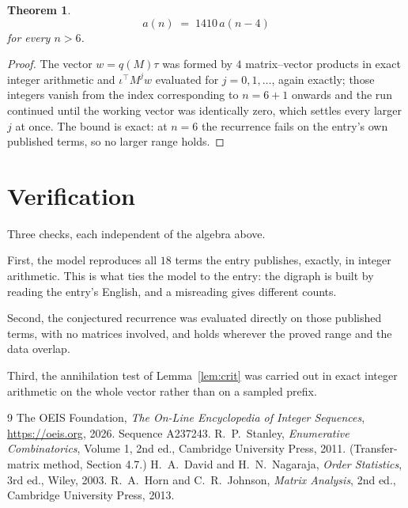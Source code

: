 \documentclass[11pt,a4paper]{article}
\theoremstyle{plain}
\newtheorem{theorem}{Theorem}
\theoremstyle{definition}
\begin{document}
\begin{theorem}
\[
a(n)\;=\;1410\,a(n-4)
\]
for every $n>6$.
\end{theorem}

\begin{proof}
The vector $w=q(M)\tau$ was formed by $4$ matrix--vector products in exact integer
arithmetic and $\iota^{\!\top}M^{j}w$ evaluated for $j=0,1,\dots$, again exactly; those
integers vanish from the index corresponding to $n=6+1$ onwards and the run continued
until the working vector was identically zero, which settles every larger $j$ at once. The bound is exact: at $n=6$ the recurrence fails on the entry's own published terms, so no larger range holds.
\end{proof}

\section{Verification}

Three checks, each independent of the algebra above.

First, the model reproduces all $18$ terms the entry publishes, exactly, in integer
arithmetic. This is what ties the model to the entry: the digraph is built by reading the
entry's English, and a misreading gives different counts.

Second, the conjectured recurrence was evaluated directly on those published terms, with no
matrices involved, and holds wherever the proved range and the data overlap.

Third, the annihilation test of Lemma~\ref{lem:crit} was carried out in exact integer
arithmetic on the whole vector rather than on a sampled prefix.

\begin{thebibliography}{9}
 The OEIS Foundation, \emph{The On-Line Encyclopedia of Integer
Sequences}, \url{https://oeis.org}, 2026. Sequence A237243.
 R.~P.~Stanley, \emph{Enumerative Combinatorics}, Volume 1, 2nd ed.,
Cambridge University Press, 2011. (Transfer-matrix method, Section 4.7.)
 H.~A.~David and H.~N.~Nagaraja, \emph{Order Statistics}, 3rd ed., Wiley,
2003.
 R.~A.~Horn and C.~R.~Johnson, \emph{Matrix Analysis}, 2nd ed., Cambridge
University Press, 2013.
\end{thebibliography}
\end{document}
